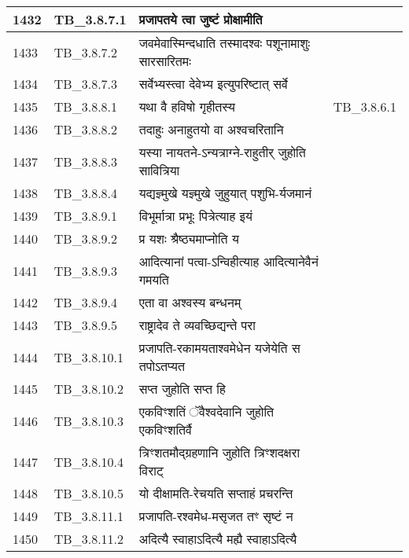 \documentclass[17pt]{extarticle}
\begin{document}
\begin{longtable}{||p{0.4in}||p{0.9in}||p{4.0in}||p{0.9in}||}
            1432 & TB\_3.8.7.1 & प्रजापतये त्वा जुष्टं प्रोक्षामीति &      \\
        \hline
            1433 & TB\_3.8.7.2 & जवमेवास्मिन्दधाति तस्मादश्वः पशूनामाशुः सारसारितमः &      \\
        \hline
            1434 & TB\_3.8.7.3 & सर्वेभ्यस्त्वा देवेभ्य इत्युपरिष्टात् सर्वे &      \\
        \hline
            1435 & TB\_3.8.8.1 & यथा वै हविषो गृहीतस्य & TB\_3.8.6.1        \\
        \hline
            1436 & TB\_3.8.8.2 & तदाहुः अनाहुतयो वा अश्वचरितानि &      \\
        \hline
            1437 & TB\_3.8.8.3 & यस्या नायतने{-}ऽन्यत्राग्ने{-}राहुतीर् जुहोति सावित्रिया &      \\
        \hline
            1438 & TB\_3.8.8.4 & यद्यज्ञ्मुखे यज्ञ्मुखे जुहुयात् पशुभि{-}र्यजमानं &      \\
        \hline
            1439 & TB\_3.8.9.1 & विभूर्मात्रा प्रभूः पित्रेत्याह इयं &      \\
        \hline
            1440 & TB\_3.8.9.2 & प्र यशः श्रैष्ठ्यमाप्नोति य &      \\
        \hline
            1441 & TB\_3.8.9.3 & आदित्यानां पत्वा{-}ऽन्विहीत्याह आदित्यानेवैनं गमयति &      \\
        \hline
            1442 & TB\_3.8.9.4 & एता वा अश्वस्य बन्धनम् &      \\
        \hline
            1443 & TB\_3.8.9.5 & राष्ट्रादेव ते व्यवच्छिद्यन्ते परा &      \\
        \hline
            1444 & TB\_3.8.10.1 & प्रजापति{-}रकामयताश्वमेधेन यजेयेति स तपोऽतप्यत &      \\
        \hline
            1445 & TB\_3.8.10.2 & सप्त जुहोति सप्त हि &      \\
        \hline
            1446 & TB\_3.8.10.3 & एकविꣳशतिं ॅवैश्वदेवानि जुहोति एकविꣳशतिर्वै &      \\
        \hline
            1447 & TB\_3.8.10.4 & त्रिꣳशतमौद्ग्रहणानि जुहोति त्रिꣳशदक्षरा विराट् &      \\
        \hline
            1448 & TB\_3.8.10.5 & यो दीक्षामति{-}रेचयति सप्ताहं प्रचरन्ति &      \\
        \hline
            1449 & TB\_3.8.11.1 & प्रजापति{-}रश्वमेध{-}मसृजत तꣳ सृष्टं न &      \\
        \hline
            1450 & TB\_3.8.11.2 & अदित्यै स्वाहाऽदित्यै मह्यै स्वाहाऽदित्यै &      \\

\end{longtable}
\end{document}
